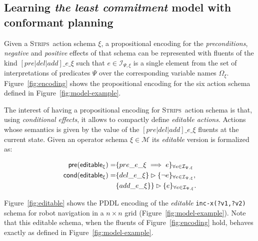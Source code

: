 \documentclass{article}
\newcommand{\pre}{\mathsf{pre}}     %
\newcommand{\cond}{\mathsf{cond}}   %
\newcommand{\strips}{\textsc{Strips}}
\begin{document}
\subsection{Learning {\em the least commitment} model with conformant planning}
Given a \strips\ action schema $\xi$, a propositional encoding for the {\em preconditions}, {\em negative} and {\em positive} effects of that schema can be represented with fluents of the kind $[pre|del|add]\_e\_\xi$ such that $e\in{\mathcal I}_{\Psi,\xi}$ is a single element from the set of interpretations of predicates $\Psi$ over the corresponding variable names $\Omega_\xi$. Figure~\ref{fig:encoding} shows the propositional encoding for the six action schema defined in Figure~\ref{fig:model-example}.

The interest of having a propositional encoding for \strips\ action schema is that, using {\em conditional effects}, it allows to compactly define {\em editable actions}. Actions whose semantics is given by the value of the $[pre|del|add]\_e\_\xi$ fluents at the current state. Given an operator schema $\xi\in\mathcal{M}$ its {\em editable} version is formalized as:
\begin{small}  
\begin{align*}
\hspace*{7pt}\pre(\mathsf{editable_{\xi}})=&\{pre\_e\_\xi\implies e\}_{\forall e\in{\mathcal I}_{\Psi,\xi}}\\
\cond(\mathsf{editable_{\xi}})=&\{del\_e\_\xi\}\rhd\{\neg e\}_{\forall e\in{\mathcal I}_{\Psi,\xi}},\\
&\{add\_e\_\xi\}\}\rhd\{e\}_{\forall e\in{\mathcal I}_{\Psi,\xi}}.
\end{align*}
\end{small}

Figure~\ref{fig:editable} shows the PDDL encoding of the {\em editable} {\tt\small inc-x(?v1,?v2)} schema for robot navigation in a $n\times n$ grid (Figure~\ref{fig:model-example}). Note that this editable schema, when the fluents of Figure~\ref{fig:encoding} hold, behaves exactly as defined in Figure~\ref{fig:model-example}. 
\end{document}
